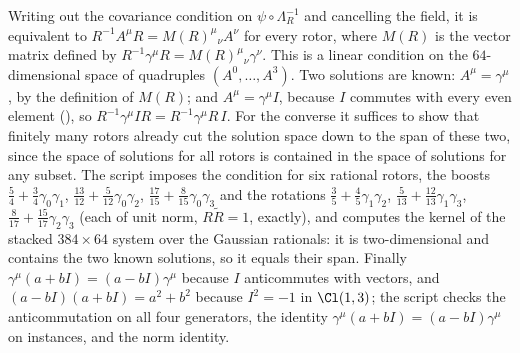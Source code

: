 Writing out the covariance condition on $\psi \circ \Lambda_{R}^{-1}$ and cancelling the field, it is equivalent to $R^{-1}A^{\mu}R = M(R)^{\mu}{}_{\nu}A^{\nu}$ for every rotor, where $M(R)$ is the vector matrix defined by $R^{-1}\gamma^{\mu}R = M(R)^{\mu}{}_{\nu}\gamma^{\nu}$. This is a linear condition on the $64$-dimensional space of quadruples $(A^{0}, \dots, A^{3})$. Two solutions are known: $A^{\mu} = \gamma^{\mu}$, by the definition of $M(R)$; and $A^{\mu} = \gamma^{\mu}I$, because $I$ commutes with every even element (), so $R^{-1}\gamma^{\mu}IR = R^{-1}\gamma^{\mu}R\,I$. For the converse it suffices to show that finitely many rotors already cut the solution space down to the span of these two, since the space of solutions for all rotors is contained in the space of solutions for any subset. The script imposes the condition for six rational rotors, the boosts $\tfrac54 + \tfrac34\gamma_{0}\gamma_{1}$, $\tfrac{13}{12} + \tfrac{5}{12}\gamma_{0}\gamma_{2}$, $\tfrac{17}{15} + \tfrac{8}{15}\gamma_{0}\gamma_{3}$ and the rotations $\tfrac35 + \tfrac45\gamma_{1}\gamma_{2}$, $\tfrac{5}{13} + \tfrac{12}{13}\gamma_{1}\gamma_{3}$, $\tfrac{8}{17} + \tfrac{15}{17}\gamma_{2}\gamma_{3}$ (each of unit norm, $R\tilde{R} = 1$, exactly), and computes the kernel of the stacked $384 \times 64$ system over the Gaussian rationals: it is two-dimensional and contains the two known solutions, so it equals their span. Finally $\gamma^{\mu}(a + bI) = (a - bI)\gamma^{\mu}$ because $I$ anticommutes with vectors, and $(a - bI)(a + bI) = a^{2} + b^{2}$ because $I^{2} = -1$ in $\Cl(1,3)$; the script checks the anticommutation on all four generators, the identity $\gamma^{\mu}(a+bI) = (a-bI)\gamma^{\mu}$ on instances, and the norm identity.

